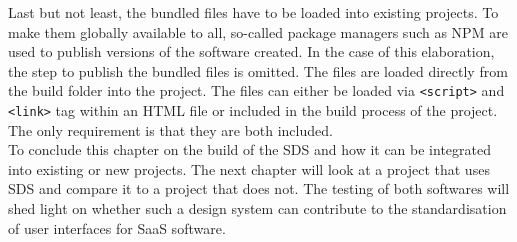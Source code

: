 Last but not least, the bundled files have to be loaded into existing projects. To make them globally available to all, so-called package managers such as NPM are used to publish versions of the software created. In the case of this elaboration, the step to publish the bundled files is omitted. The files are loaded directly from the build folder into the project. The files can either be loaded via \texttt{<script>} and \texttt{<link>} tag within an HTML file or included in the build process of the project. The only requirement is that they are both included. \\
To conclude this chapter on the build of the \ac{SDS} and how it can be integrated into existing or new projects. The next chapter will look at a project that uses \ac{SDS} and compare it to a project that does not. The testing of both softwares will shed light on whether such a design system can contribute to the standardisation of user interfaces for \ac{SaaS} software. 
